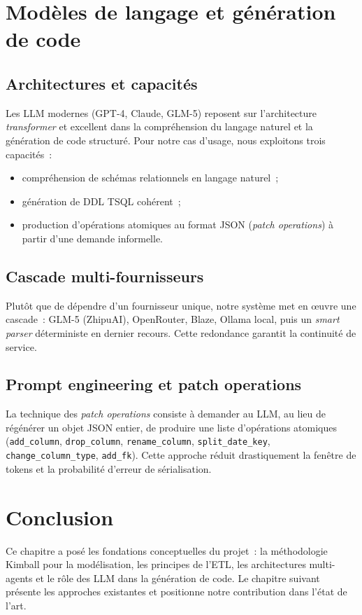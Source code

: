 \documentclass[12pt, a4paper]{report}
\begin{document}
\section{Modèles de langage et génération de code}

\subsection{Architectures et capacités}
Les \ac{LLM} modernes (GPT-4, Claude, GLM-5) reposent sur l'architecture
\emph{transformer} et excellent dans la compréhension du langage
naturel et la génération de code structuré. Pour notre cas d'usage,
nous exploitons trois capacités~:
\begin{itemize}
  \item compréhension de schémas relationnels en langage naturel~;
  \item génération de \ac{DDL} \ac{TSQL} cohérent~;
  \item production d'opérations atomiques au format \ac{JSON}
        (\emph{patch operations}) à partir d'une demande informelle.
\end{itemize}

\subsection{Cascade multi-fournisseurs}
Plutôt que de dépendre d'un fournisseur unique, notre système met en
œuvre une cascade~: GLM-5 (ZhipuAI), OpenRouter, Blaze, Ollama local,
puis un \emph{smart parser} déterministe en dernier recours. Cette
redondance garantit la continuité de service.

\subsection{Prompt engineering et patch operations}
La technique des \emph{patch operations} consiste à demander au \ac{LLM},
au lieu de régénérer un objet \ac{JSON} entier, de produire une liste
d'opérations atomiques (\texttt{add\_column}, \texttt{drop\_column},
\texttt{rename\_column}, \texttt{split\_date\_key},
\texttt{change\_column\_type}, \texttt{add\_fk}). Cette approche réduit
drastiquement la fenêtre de tokens et la probabilité d'erreur de
sérialisation.

\section{Conclusion}
Ce chapitre a posé les fondations conceptuelles du projet~: la
méthodologie Kimball pour la modélisation, les principes de l'\ac{ETL},
les architectures multi-agents et le rôle des \ac{LLM} dans la
génération de code. Le chapitre suivant présente les approches
existantes et positionne notre contribution dans l'état de l'art.
\end{document}
